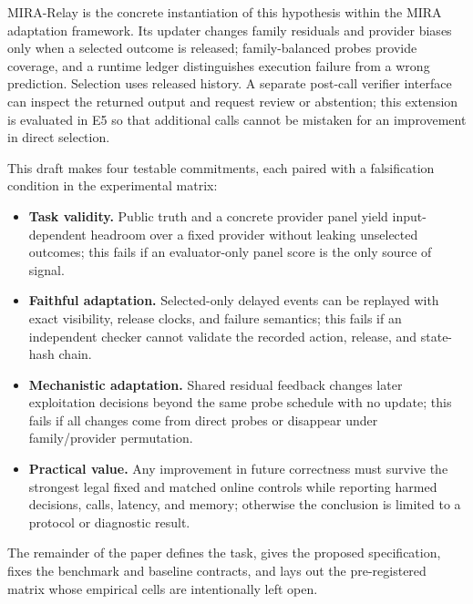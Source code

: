 \documentclass[sigconf,anonymous]{aamas}
\begin{document}
MIRA-Relay is the concrete instantiation of this hypothesis within the MIRA adaptation framework. Its updater changes family residuals and provider biases only when a selected outcome is released; family-balanced probes provide coverage, and a runtime ledger distinguishes execution failure from a wrong prediction. Selection uses released history. A separate post-call verifier interface can inspect the returned output and request review or abstention; this extension is evaluated in E5 so that additional calls cannot be mistaken for an improvement in direct selection.

This draft makes four testable commitments, each paired with a falsification condition in the experimental matrix:
\begin{itemize}[leftmargin=*,itemsep=1pt,topsep=2pt]
    \item \textbf{Task validity.} Public truth and a concrete provider panel yield input-dependent headroom over a fixed provider without leaking unselected outcomes; this fails if an evaluator-only panel score is the only source of signal.
    \item \textbf{Faithful adaptation.} Selected-only delayed events can be replayed with exact visibility, release clocks, and failure semantics; this fails if an independent checker cannot validate the recorded action, release, and state-hash chain.
    \item \textbf{Mechanistic adaptation.} Shared residual feedback changes later exploitation decisions beyond the same probe schedule with no update; this fails if all changes come from direct probes or disappear under family/provider permutation.
    \item \textbf{Practical value.} Any improvement in future correctness must survive the strongest legal fixed and matched online controls while reporting harmed decisions, calls, latency, and memory; otherwise the conclusion is limited to a protocol or diagnostic result.
\end{itemize}
The remainder of the paper defines the task, gives the proposed specification, fixes the benchmark and baseline contracts, and lays out the pre-registered matrix whose empirical cells are intentionally left open.
\end{document}
